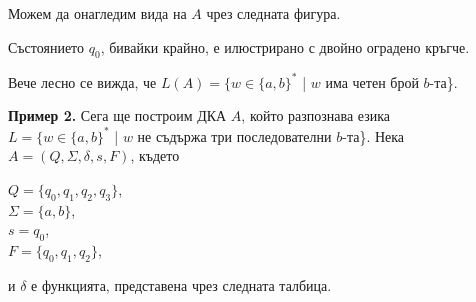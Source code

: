 \documentclass{article}
\begin{document}
    \vspace{5pt}

    Можем да онагледим вида на $A$ чрез следната фигура.

    \vspace{5pt}

    \begin{center}
    \end{center}

    \vspace{5pt}

    Състоянието $q_0$, бивайки крайно, е илюстрирано с двойно оградено кръгче.

    \vspace{5pt}

    Вече лесно се вижда, че $L(A) = \{w \in \{a,b\}^*$ | $w$ има четен брой $b$-та\}.

    \vspace{10pt}

    \textbf{Пример 2.} Сега ще построим ДКА $A$, който разпознава езика \\ $L = \{w \in \{a,b\}^*$ | $w$ не съдържа три последователни $b$-та\}.
    Нека \\ $A = (Q, \Sigma, \delta, s, F)$, където
    \begin{center}
        $Q = \{q_0, q_1, q_2, q_3\}$, \\
        $\Sigma = \{a,b\}$, \\
        $s = q_0$, \\
        $F = \{q_0, q_1, q_2\}$,
    \end{center}
    и $\delta$ е функцията, представена чрез следната талбица.

    \vspace{5pt} 
\end{document}
